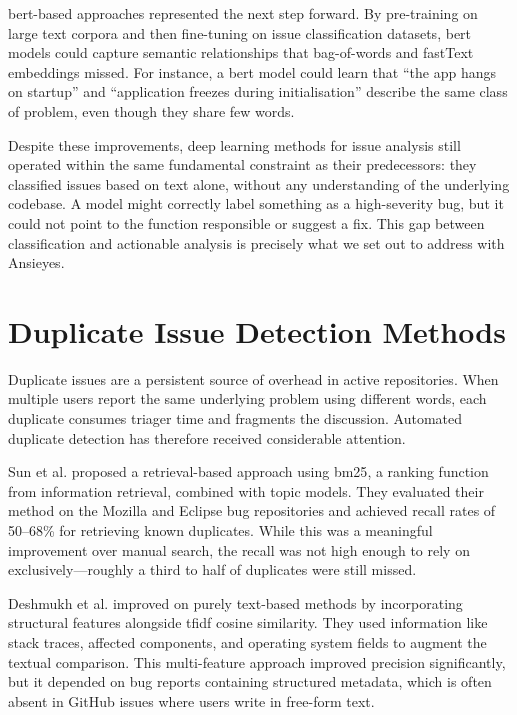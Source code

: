 \gls{bert}-based approaches represented the next step forward. By pre-training on large text corpora and then fine-tuning on issue classification datasets, \gls{bert} models could capture semantic relationships that bag-of-words and fastText embeddings missed. For instance, a \gls{bert} model could learn that ``the app hangs on startup'' and ``application freezes during initialisation'' describe the same class of problem, even though they share few words.

Despite these improvements, deep learning methods for issue analysis still operated within the same fundamental constraint as their predecessors: they classified issues based on text alone, without any understanding of the underlying codebase. A model might correctly label something as a high-severity bug, but it could not point to the function responsible or suggest a fix. This gap between classification and actionable analysis is precisely what we set out to address with Ansieyes.

\section{\textbf{Duplicate Issue Detection Methods}}

Duplicate issues are a persistent source of overhead in active repositories. When multiple users report the same underlying problem using different words, each duplicate consumes triager time and fragments the discussion. Automated duplicate detection has therefore received considerable attention.

Sun et al. \cite{Sun2011} proposed a retrieval-based approach using \gls{bm25}, a ranking function from information retrieval, combined with topic models. They evaluated their method on the Mozilla and Eclipse bug repositories and achieved recall rates of 50--68\% for retrieving known duplicates. While this was a meaningful improvement over manual search, the recall was not high enough to rely on exclusively---roughly a third to half of duplicates were still missed.

Deshmukh et al. \cite{Deshmukh2017} improved on purely text-based methods by incorporating structural features alongside \gls{tfidf} cosine similarity. They used information like stack traces, affected components, and operating system fields to augment the textual comparison. This multi-feature approach improved precision significantly, but it depended on bug reports containing structured metadata, which is often absent in GitHub issues where users write in free-form text.

